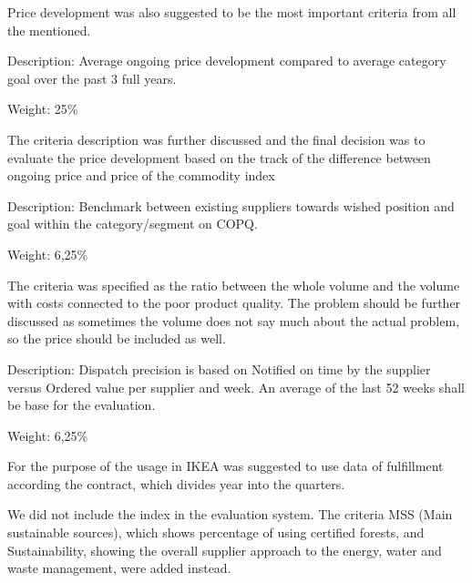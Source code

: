 \documentclass[oneside,12pt]{article}%
\begin{document}
Price development was also suggested to be the most important criteria from all the mentioned.


Description: Average ongoing price development compared to average category goal over the past 3 full years. \par

\vspace{2mm}
\noindent Weight: 25\%
\vspace{2mm}

The criteria description was further discussed and the final decision was to evaluate the price development based on the track of the difference between ongoing price and price of the commodity index


Description: Benchmark between existing suppliers towards wished position and goal within the category/segment on COPQ.

\vspace{2mm}
\noindent Weight: 6,25\%
\vspace{2mm}

The criteria was specified as the ratio between the whole volume and the volume with costs connected to the poor product quality. The problem should be further discussed as sometimes the volume does not say much about the actual problem, so the price should be included as well.


Description: Dispatch precision is based on Notified on time by the supplier versus Ordered value per supplier and week. An average of the last 52 weeks shall be base for the evaluation. \par

\vspace{2mm}
\noindent Weight: 6,25\%
\vspace{2mm} \par

For the purpose of the usage in IKEA was suggested to use data of fulfillment according the contract, which divides year into the quarters.

We did not include the index in the evaluation system. The criteria MSS (Main sustainable sources), which shows percentage of using certified forests, and Sustainability, showing the overall supplier approach to the energy, water and waste management, were added instead. \par
\end{document}
